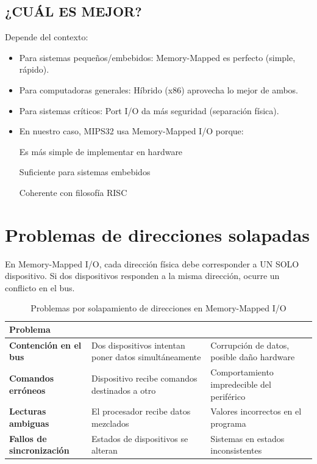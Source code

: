 \documentclass{article}
\begin{document}
\subsection{ ¿CUÁL ES MEJOR?}
Depende del contexto:
\begin{itemize}
    \item Para sistemas pequeños/embebidos:
Memory-Mapped es perfecto (simple, rápido).

    \item Para computadoras generales:
Híbrido (x86) aprovecha lo mejor de ambos.

    \item Para sistemas críticos:
Port I/O da más seguridad (separación física).

    \item En nuestro caso, MIPS32 usa Memory-Mapped I/O porque:

    Es más simple de implementar en hardware

    Suficiente para sistemas embebidos

    Coherente con filosofía RISC

\end{itemize}
\section{Problemas de direcciones solapadas}
En Memory-Mapped I/O, cada dirección física debe corresponder a UN SOLO dispositivo. Si dos dispositivos responden a la misma dirección, ocurre un conflicto en el bus.
\begin{table}[h]
\centering
\begin{tabular}{>{\bfseries}l >{\RaggedRight}p{3.5cm} >{\RaggedRight}p{4cm}}
\toprule
{\textbf{Problema}} \\
\midrule
Contención en el bus & Dos dispositivos intentan poner datos simultáneamente & Corrupción de datos, posible daño hardware \\
\midrule
Comandos erróneos & Dispositivo recibe comandos destinados a otro & Comportamiento impredecible del periférico \\
\midrule
Lecturas ambiguas & El procesador recibe datos mezclados & Valores incorrectos en el programa \\
\midrule
Fallos de sincronización & Estados de dispositivos se alteran & Sistemas en estados inconsistentes \\
\bottomrule
\end{tabular}
\caption{Problemas por solapamiento de direcciones en Memory-Mapped I/O}
\label{tab:problemas_solapamiento}
\end{table}
\end{document}
